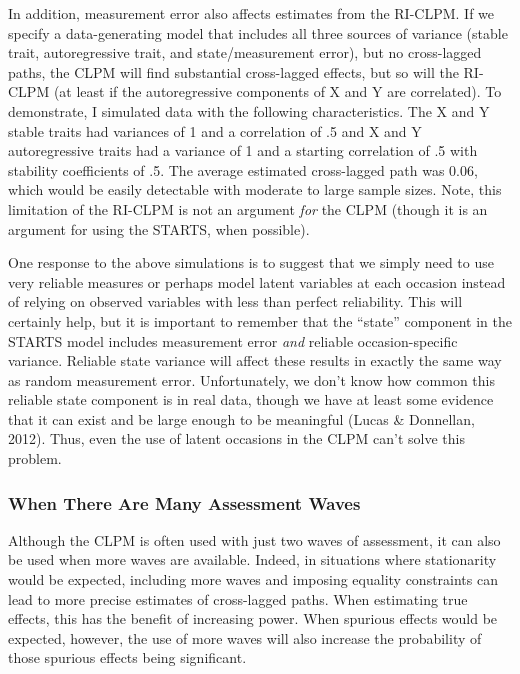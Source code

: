 \documentclass[
  english,
  man,floatsintext]{apa6}
\begin{document}
In addition, measurement error also affects estimates from the RI-CLPM. If we specify a data-generating model that includes all three sources of variance (stable trait, autoregressive trait, and state/measurement error), but no cross-lagged paths, the CLPM will find substantial cross-lagged effects, but so will the RI-CLPM (at least if the autoregressive components of X and Y are correlated). To demonstrate, I simulated data with the following characteristics. The X and Y stable traits had variances of 1 and a correlation of .5 and X and Y autoregressive traits had a variance of 1 and a starting correlation of .5 with stability coefficients of .5. The average estimated cross-lagged path was 0.06, which would be easily detectable with moderate to large sample sizes. Note, this limitation of the RI-CLPM is not an argument \emph{for} the CLPM (though it is an argument for using the STARTS, when possible).

One response to the above simulations is to suggest that we simply need to use very reliable measures or perhaps model latent variables at each occasion instead of relying on observed variables with less than perfect reliability. This will certainly help, but it is important to remember that the ``state'' component in the STARTS model includes measurement error \emph{and} reliable occasion-specific variance. Reliable state variance will affect these results in exactly the same way as random measurement error. Unfortunately, we don't know how common this reliable state component is in real data, though we have at least some evidence that it can exist and be large enough to be meaningful (Lucas \& Donnellan, 2012). Thus, even the use of latent occasions in the CLPM can't solve this problem.

\hypertarget{when-there-are-many-assessment-waves}{%
\subsubsection{When There Are Many Assessment Waves}\label{when-there-are-many-assessment-waves}}

Although the CLPM is often used with just two waves of assessment, it can also be used when more waves are available. Indeed, in situations where stationarity would be expected, including more waves and imposing equality constraints can lead to more precise estimates of cross-lagged paths. When estimating true effects, this has the benefit of increasing power. When spurious effects would be expected, however, the use of more waves will also increase the probability of those spurious effects being significant.
\end{document}
